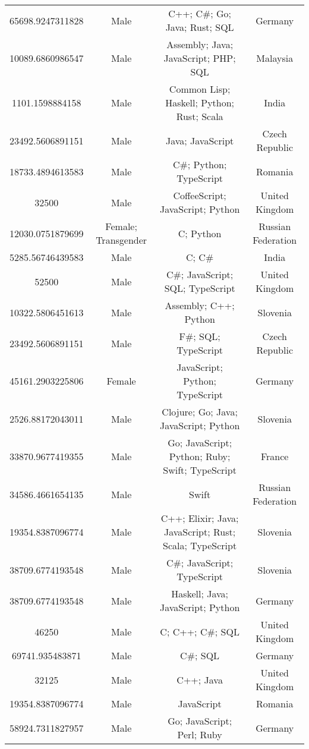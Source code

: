 \begin{center}
\begin{tabular}{ |c|c|c|c| }
65698.9247311828  &  Male  &  C++; C\#; Go; Java; Rust; SQL  &  Germany  \\ 
10089.6860986547  &  Male  &  Assembly; Java; JavaScript; PHP; SQL  &  Malaysia  \\ 
1101.1598884158  &  Male  &  Common Lisp; Haskell; Python; Rust; Scala  &  India  \\ 
23492.5606891151  &  Male  &  Java; JavaScript  &  Czech Republic  \\ 
18733.4894613583  &  Male  &  C\#; Python; TypeScript  &  Romania  \\ 
32500  &  Male  &  CoffeeScript; JavaScript; Python  &  United Kingdom  \\ 
12030.0751879699  &  Female; Transgender  &  C; Python  &  Russian Federation  \\ 
5285.56746439583  &  Male  &  C; C\#  &  India  \\ 
52500  &  Male  &  C\#; JavaScript; SQL; TypeScript  &  United Kingdom  \\ 
10322.5806451613  &  Male  &  Assembly; C++; Python  &  Slovenia  \\ 
23492.5606891151  &  Male  &  F\#; SQL; TypeScript  &  Czech Republic  \\ 
45161.2903225806  &  Female  &  JavaScript; Python; TypeScript  &  Germany  \\ 
2526.88172043011  &  Male  &  Clojure; Go; Java; JavaScript; Python  &  Slovenia  \\ 
33870.9677419355  &  Male  &  Go; JavaScript; Python; Ruby; Swift; TypeScript  &  France  \\ 
34586.4661654135  &  Male  &  Swift  &  Russian Federation  \\ 
19354.8387096774  &  Male  &  C++; Elixir; Java; JavaScript; Rust; Scala; TypeScript  &  Slovenia  \\ 
38709.6774193548  &  Male  &  C\#; JavaScript; TypeScript  &  Slovenia  \\ 
38709.6774193548  &  Male  &  Haskell; Java; JavaScript; Python  &  Germany  \\ 
46250  &  Male  &  C; C++; C\#; SQL  &  United Kingdom  \\ 
69741.935483871  &  Male  &  C\#; SQL  &  Germany  \\ 
32125  &  Male  &  C++; Java  &  United Kingdom  \\ 
19354.8387096774  &  Male  &  JavaScript  &  Romania  \\ 
58924.7311827957  &  Male  &  Go; JavaScript; Perl; Ruby  &  Germany  \\ 

\end{tabular}
\end{center}
